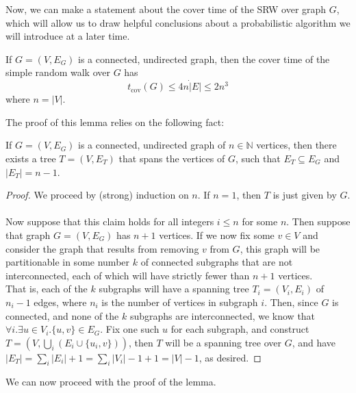 	Now, we can make a statement about the cover time of the SRW over graph $G$, which will
	allow us to draw helpful conclusions about a probabilistic algorithm we will introduce at
	a later time.
	\begin{lemma}
		\label{lemma:srwtcov}
		If $G = (V, E_G)$ is a connected, undirected graph, then the cover time of the 
		simple random walk over $G$ has 
		$$
			t_\mathrm{cov}(G) \leq 4n \dot |E| \leq 2n^3
		$$
		where $n = |V|$.
	\end{lemma}
	The proof of this lemma relies on the following fact:
	\begin{claim}
		If $G = (V, E_G)$ is a connected, undirected graph of $n\in\mathbb{N}$ vertices, 
		then there exists a tree $T = (V, E_T)$ that spans the vertices of $G$, such that 
		$E_T \subseteq E_G$ and $|E_T| = n-1$.
	\end{claim}
	\begin{proof}
		We proceed by (strong) induction on $n$. If $n = 1$, then $T$ is just given by $G$.
		\\\ \\
		Now suppose that this claim holds for all integers $i \leq n$ for some $n$. Then
		suppose that graph $G = (V,E_G)$ has $n+1$ vertices. If we now fix some $v \in V$
		and consider the graph that results from removing $v$ from $G$, this graph will 
		be partitionable in some number $k$ of connected subgraphs that are not 
		interconnected, each of which will have strictly fewer than $n+1$ vertices.
		\\
		That is, each of the $k$ subgraphs will have a spanning tree $T_i = (V_i, E_i)$ 
		of $n_i - 1$ 
		edges, where $n_i$ is the number of vertices in subgraph $i$. Then, since $G$ is 
		connected, and none of the $k$ subgraphs are interconnected, we know that $\forall
		i. \exists u \in V_i . \{u, v\} \in E_G$. Fix one such $u$ for each subgraph, and 
		construct $T=(V, \bigcup_i (E_i \cup \{u_i, v\}))$, then $T$ will be a spanning 
		tree over $G$, and have $|E_T| = \sum_i |E_i| + 1 = \sum_i |V_i| - 1 +1 = |V|-1$,
		as desired.
	\end{proof}
	We can now proceed with the proof of the lemma.
